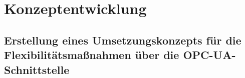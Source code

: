 \section{Konzeptentwicklung}
\label{ch_06Konzeptentwicklung}


\subsection{Erstellung eines Umsetzungskonzepts für die Flexibilitätsmaßnahmen über die OPC-UA-Schnittstelle}
\label{ch_06Erstellung eines Umsetzungskonzepts für die Flexibilitätsmaßnahmen über die OPC-UA-Schnittstelle}


